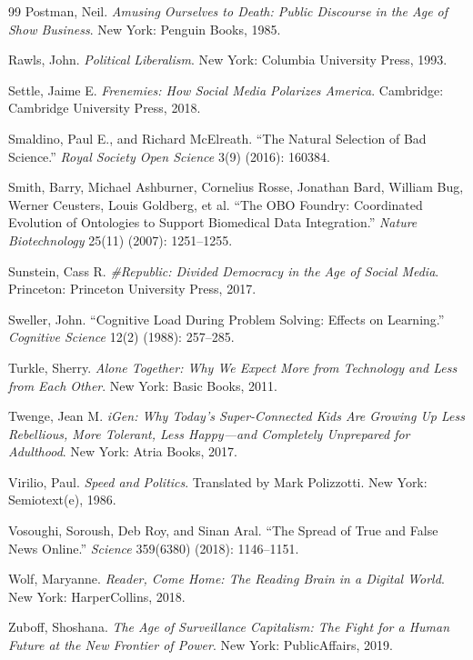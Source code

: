 \documentclass[12pt]{article}
\theoremstyle{definition}
\theoremstyle{plain}
\begin{document}
\begin{thebibliography}{99}
Postman, Neil.
\newblock \emph{Amusing Ourselves to Death: Public Discourse in the Age of Show Business}.
\newblock New York: Penguin Books, 1985.

Rawls, John.
\newblock \emph{Political Liberalism}.
\newblock New York: Columbia University Press, 1993.

Settle, Jaime E.
\newblock \emph{Frenemies: How Social Media Polarizes America}.
\newblock Cambridge: Cambridge University Press, 2018.

Smaldino, Paul E., and Richard McElreath.
\newblock ``The Natural Selection of Bad Science.''
\newblock \emph{Royal Society Open Science} 3(9) (2016): 160384.

Smith, Barry, Michael Ashburner, Cornelius Rosse, Jonathan Bard, William Bug, Werner Ceusters, Louis Goldberg, et al.
\newblock ``The OBO Foundry: Coordinated Evolution of Ontologies to Support Biomedical Data Integration.''
\newblock \emph{Nature Biotechnology} 25(11) (2007): 1251--1255.

Sunstein, Cass R.
\newblock \emph{\#Republic: Divided Democracy in the Age of Social Media}.
\newblock Princeton: Princeton University Press, 2017.

Sweller, John.
\newblock ``Cognitive Load During Problem Solving: Effects on Learning.''
\newblock \emph{Cognitive Science} 12(2) (1988): 257--285.

Turkle, Sherry.
\newblock \emph{Alone Together: Why We Expect More from Technology and Less from Each Other}.
\newblock New York: Basic Books, 2011.

Twenge, Jean M.
\newblock \emph{iGen: Why Today's Super-Connected Kids Are Growing Up Less Rebellious, More Tolerant, Less Happy---and Completely Unprepared for Adulthood}.
\newblock New York: Atria Books, 2017.

Virilio, Paul.
\newblock \emph{Speed and Politics}.
\newblock Translated by Mark Polizzotti. New York: Semiotext(e), 1986.

Vosoughi, Soroush, Deb Roy, and Sinan Aral.
\newblock ``The Spread of True and False News Online.''
\newblock \emph{Science} 359(6380) (2018): 1146--1151.

Wolf, Maryanne.
\newblock \emph{Reader, Come Home: The Reading Brain in a Digital World}.
\newblock New York: HarperCollins, 2018.

Zuboff, Shoshana.
\newblock \emph{The Age of Surveillance Capitalism: The Fight for a Human Future at the New Frontier of Power}.
\newblock New York: PublicAffairs, 2019.

\end{thebibliography}
\end{document}
